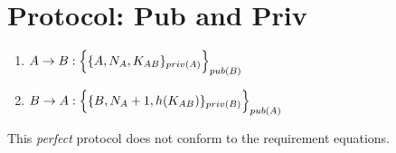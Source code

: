\section{Protocol: Pub and Priv}

\begin{enumerate}
    \item $ A \rightarrow B : \Bigl\{ \{A, N_A, K_{AB}\}_{priv(A)}\Bigr\}_{pub(B)}$
    \item $ B \rightarrow A : \Bigl\{ \{B, N_A +1,h(K_{AB})\}_{priv(B)}\Bigr\}_{pub(A)}$

\end{enumerate}

This \textit{perfect} protocol does not conform to the requirement equations.
